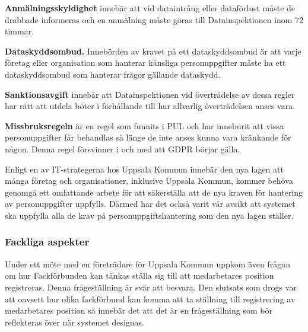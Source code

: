 \documentclass[a4paper,12pt]{article}
\begin{document}
 \textbf{Anmälningsskyldighet} innebär att vid dataintrång eller dataförlust måste de drabbade informeras och en anmälning måste göras till Datainspektionen inom 72 timmar.

 \textbf{Dataskyddsombud.} Innebörden av kravet på ett dataskyddsombud är att varje företag eller organisation som hanterar känsliga personuppgifter måste ha ett dataskyddsombud som hanterar frågor gällande dataskydd.

 \textbf{Sanktionsavgift} innebär att Datainspektionen vid överträdelse av dessa regler har rätt att utdela böter i förhållande till hur allvarlig överträdelsen anses vara.

 \textbf{Missbruksregeln} är en regel som funnits i PUL och har inneburit att vissa personuppgifter får behandlas så länge de inte anses kunna vara kränkande för någon. Denna regel försvinner i och med att GDPR börjar gälla.

 Enligt en av IT-strategerna hos Uppsala Kommun innebär den nya lagen att många företag och organisationer, inklusive Uppsala Kommun, kommer behöva genomgå ett omfattande arbete för att säkerställa att de nya kraven för hantering av personuppgifter uppfylls.
 Därmed har det också varit vår avsikt att systemet ska uppfylla alla de krav på personuppgiftshantering som den nya lagen ställer.

 \subsubsection{Fackliga aspekter}
 Under ett möte med en företrädare för Uppsala Kommun uppkom även frågan om hur Fackförbunden kan tänkas ställa sig till att medarbetares position registreras.
 Denna frågeställning är svår att besvara. Den slutsats som drogs var att oavsett hur olika fackförbund kan komma att ta ställning till registrering av medarbetares position så innebär det att det är en frågeställning som bör reflekteras över när systemet designas.


\end{document}
